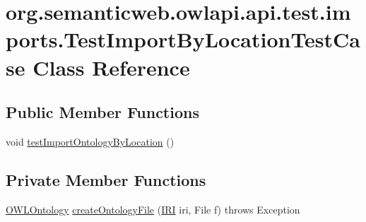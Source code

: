 \hypertarget{classorg_1_1semanticweb_1_1owlapi_1_1api_1_1test_1_1imports_1_1_test_import_by_location_test_case}{\section{org.\-semanticweb.\-owlapi.\-api.\-test.\-imports.\-Test\-Import\-By\-Location\-Test\-Case Class Reference}
\label{classorg_1_1semanticweb_1_1owlapi_1_1api_1_1test_1_1imports_1_1_test_import_by_location_test_case}
}
\subsection*{Public Member Functions}
\begin{DoxyCompactItemize}
\item 
void \hyperlink{classorg_1_1semanticweb_1_1owlapi_1_1api_1_1test_1_1imports_1_1_test_import_by_location_test_case_ab514b46b8add012ef8285a6ea6990fe8}{test\-Import\-Ontology\-By\-Location} ()
\end{DoxyCompactItemize}
\subsection*{Private Member Functions}
\begin{DoxyCompactItemize}
\item 
\hyperlink{interfaceorg_1_1semanticweb_1_1owlapi_1_1model_1_1_o_w_l_ontology}{O\-W\-L\-Ontology} \hyperlink{classorg_1_1semanticweb_1_1owlapi_1_1api_1_1test_1_1imports_1_1_test_import_by_location_test_case_ac7cc946cbb5bd30ad5966d9ba29589c0}{create\-Ontology\-File} (\hyperlink{classorg_1_1semanticweb_1_1owlapi_1_1model_1_1_i_r_i}{I\-R\-I} iri, File f)  throws Exception 
\end{DoxyCompactItemize}


